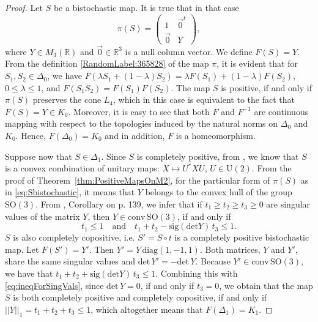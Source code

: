\documentclass[12pt]{article}
\theoremstyle{plain}
\theoremstyle{definition}
\theoremstyle{remark}
\numberwithin{equation}{section}
\begin{document}
\begin{proof}
Let $S$ be a bistochastic map.
It is true that in that case
\begin{equation}
\label{eq:Sbistochastic}
\pi(S) = \begin{pmatrix}
    1  &  \vec{0}^{t} \\
    \vec{0} & Y
    \end{pmatrix},
\end{equation}
where $Y \in M_{3}(\mathbb{R})$
and $\vec{0} \in \mathbb{R}^{3}$ is a null column vector.
We define $F(S) = Y$. 
From the definition \eqref{RandomLabel:365828} of the map $\pi$,
it is evident that for $S_{1}, S_{2} \in \Delta_{0}$,
we have 
$F \left( \lambda S_{1} + (1-\lambda) S_{2} \right) = 
\lambda F(S_{1}) + (1-\lambda) F(S_{2})$,
$0 \leq \lambda \leq 1$,  
and $F(S_{1} S_{2}) = F(S_{1}) F(S_{2})$.
The map $S$ is positive, if and only if
$\pi(S)$ preserves the cone $L_{4}$,
which in this case is equivalent to the fact that $F(S) = Y \in K_{0}$.
Moreover, it is easy to see that both $F$ and $F^{-1}$ are continuous mapping
with respect to the topologies induced by the natural norms on   
$\Delta_{0}$ and $K_{0}$.
Hence, $F(\Delta_{0}) = K_{0}$ and in addition, $F$ is a homeomorphism.

Suppose now that $S \in \Delta_{1}$.
Since $S$ is completely positive,
from \cite[Theorem 1]{landau1993birkhoff},
we know that $S$ is a convex combination of unitary maps:
$X \mapsto U^{*} X U$, $U \in \text{U}(2)$.
From the proof of \mbox{Theorem \ref{thm:PositiveMapsOnM2}},
for the particular form of $\pi(S)$ as in \eqref{eq:Sbistochastic},
it means that $Y$ belongs to the convex hull of the group $\text{SO}(3)$.
From \cite{miranda1994group}, Corollary on p. 139,
we infer that if $t_{1} \geq t_{2} \geq t_{3} \geq 0$
are singular values of the matrix $Y$,
then $Y \in \text{conv} \, \text{SO}(3)$,
if and only if
\begin{equation}
\label{eq:ineqForSingVals}
t_{1} \leq 1
\quad \text{and} \quad
t_{1} + t_{2} - \text{sig} (\text{det} Y) \, t_{3} \leq 1.
\end{equation}
$S$ is also completely copositive,
i.e. $S' = S \circ t$ is a completely positive bistochastic map.
Let $F(S') = Y'$.
Then $Y' = Y \, \text{diag} (1,-1,1)$.
Both matrices, $Y$ and $Y'$, share the same singular values and
$\text{det} \, Y' = - \text{det} \, Y$.
Because $Y' \in  \text{conv} \, \text{SO}(3)$,
we have that
$t_{1} + t_{2} + \text{sig} (\text{det} Y) \, t_{3} \leq 1$.
Combining this with \eqref{eq:ineqForSingVals},
since $\text{det} \, Y = 0$, if and only if $t_{3} = 0$,
we obtain that the map $S$ is both completely positive
and completely copositive, if and only if
$||Y||_{1} = t_{1} + t_{2} + t_{3} \leq 1$,
which altogether means that $F(\Delta_{1}) = K_{1}$. 
\end{proof}
\end{document}
